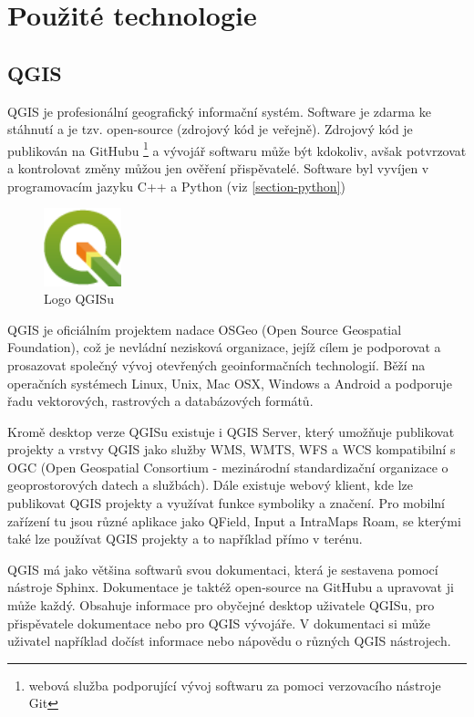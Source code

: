\chapter{Použité technologie}
\label{4-technologie}

\section{QGIS}

QGIS je profesionální geografický informační systém.
Software je zdarma ke stáhnutí a je tzv. open-source (zdrojový kód je veřejně).
Zdrojový kód je publikován na GitHubu \footnote{webová služba podporující vývoj softwaru za pomoci verzovacího nástroje Git}
a vývojář softwaru může být kdokoliv, avšak potvrzovat a kontrolovat změny můžou jen ověření
přispěvatelé. Software byl vyvíjen v programovacím jazyku C++ a Python (viz \ref{section-python})

\begin{figure}[H] \centering
    \includegraphics[width=64pt]{./pictures/qgis-logo.png}
    \caption[Logo QGISu]{Logo QGISu \cite{qgis}}
	\label{fig:qgis-logo}                                
\end{figure}

QGIS je oficiálním projektem nadace OSGeo (Open Source Geospatial Foundation), což je nevládní 
nezisková organizace, jejíž cílem je podporovat a prosazovat společný vývoj otevřených geoinformačních
technologií. Běží na operačních systémech Linux, Unix, Mac OSX, Windows a Android a podporuje
řadu vektorových, rastrových a databázových formátů.

Kromě desktop verze QGISu existuje i QGIS Server, který umožňuje publikovat projekty a vrstvy
QGIS jako služby WMS, WMTS, WFS a WCS kompatibilní s OGC (Open Geospatial Consortium - mezinárodní standardizační organizace
o geoprostorových datech a službách). Dále existuje webový klient, kde lze publikovat
QGIS projekty a využívat funkce symboliky a značení. Pro mobilní zařízení tu jsou
různé aplikace jako QField, Input a IntraMaps Roam, se kterými také lze používat QGIS projekty a to 
například přímo v terénu. 


QGIS má jako většina softwarů svou dokumentaci, která je sestavena pomocí nástroje Sphinx. 
Dokumentace je taktéž open-source na GitHubu a upravovat ji může každý. Obsahuje
informace pro obyčejné desktop uživatele QGISu, pro přispěvatele dokumentace nebo pro QGIS
vývojáře. V dokumentaci si může uživatel například dočíst informace nebo nápovědu o různých
QGIS nástrojech.

